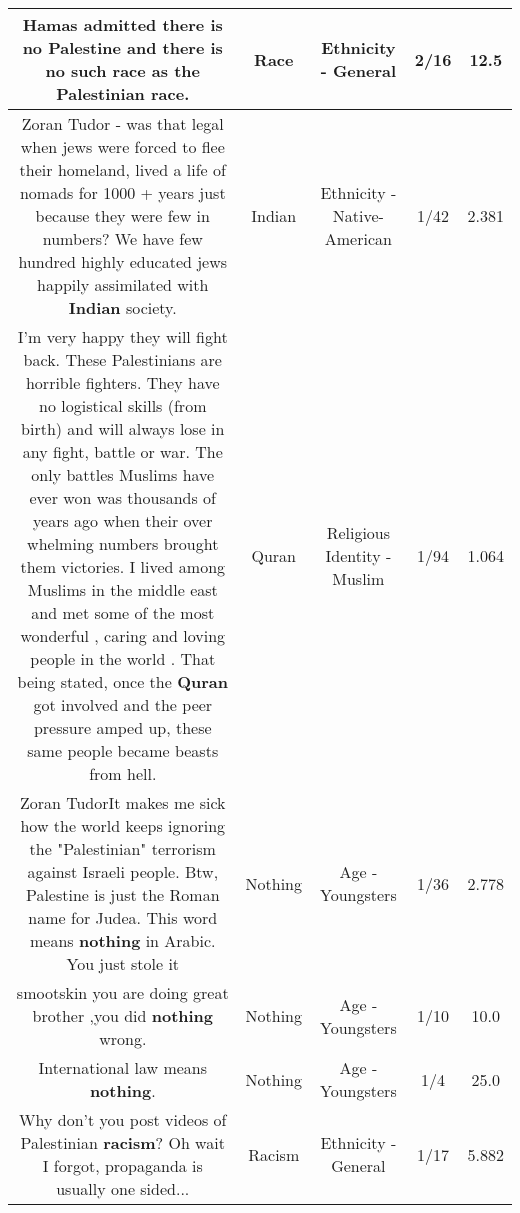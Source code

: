 \documentclass[11pt]{article}
\newlength\mylength
\begin{document}
\begin{center}
\begin{longtable}{|C{.65\mylength}|C{.30\mylength}|C{.12\mylength}|C{.12\mylength}|C{.12\mylength}|}
  \small Hamas admitted there is no Palestine and there is no such \textbf{race} as the Palestinian \textbf{race}.\normalsize   & Race & Ethnicity - General & 2/16 & 12.5 \\  \hline
  \small Zoran Tudor -  was that legal when jews were forced to flee their homeland, lived a life of nomads for 1000 + years just because they were few in numbers? We have few hundred highly educated jews happily assimilated with \textbf{Indian} society.\normalsize   & Indian & Ethnicity - Native-American & 1/42 & 2.381 \\  \hline
  \small I'm very happy they will fight back. These Palestinians are horrible fighters.  They have no logistical skills (from birth) and will always lose in any fight, battle or war.  The only battles Muslims have ever won was thousands of years ago when their over whelming numbers brought them victories. I lived among Muslims in the middle east and met some of the most wonderful , caring and loving people in the world .  That being stated, once the \textbf{Quran} got involved and the peer pressure amped up, these same people became beasts from hell.\normalsize   & Quran & Religious Identity - Muslim & 1/94 & 1.064 \\  \hline
  \small Zoran TudorIt makes me sick how the world keeps ignoring the "Palestinian" terrorism against Israeli people. Btw, Palestine is just the Roman name for Judea. This word means \textbf{nothing} in Arabic. You just stole it\normalsize   & Nothing & Age - Youngsters & 1/36 & 2.778 \\  \hline
  \small smootskin you are doing great brother ,you did \textbf{nothing} wrong.\normalsize   & Nothing & Age - Youngsters & 1/10 & 10.0 \\  \hline
  \small International law means \textbf{nothing}.\normalsize   & Nothing & Age - Youngsters & 1/4 & 25.0 \\  \hline
  \small Why don't you post videos of Palestinian \textbf{racism}? Oh wait I forgot, propaganda is usually one sided...\normalsize   & Racism & Ethnicity - General & 1/17 & 5.882 \\  \hline

\end{longtable}
\end{center}
\end{document}
